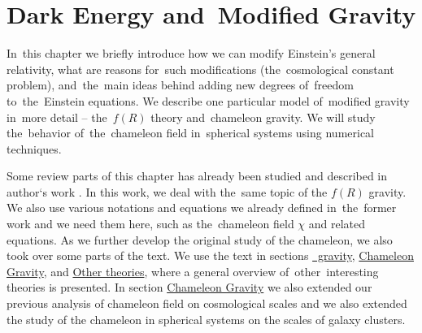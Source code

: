 \chapter{Dark Energy and~Modified Gravity}
\label{chpt:de_mg}
In~this chapter we briefly introduce how we can modify Einstein's general relativity, what are reasons for~such modifications (the~cosmological constant problem), and~the~main ideas behind adding new degrees of~freedom to~the~Einstein equations. We describe one particular model of~modified gravity in~more detail -- the~$f(R)$ theory and~chameleon gravity. We will study the~behavior of~the~chameleon field in~spherical systems using numerical techniques.

Some review parts of this chapter has already been studied and described in author`s work \textcite{mastersthesis_vrastil}. In this work, we deal with the~same topic of the $f(R)$ gravity. We also use various notations and equations we already defined in~the~former work and we need them here, such as the~chameleon field $\chi$ and related equations. As we further develop the original study of the chameleon, we also took over some parts of the text. We use the text in sections \hyperref[sec:fR]{\fR\ gravity}, \hyperref[sec_cham]{Chameleon Gravity}, and \hyperref[sec:other]{Other theories}, where a general overview of~other~interesting theories is presented. In section \hyperref[sec_cham]{Chameleon Gravity} we also extended our previous analysis of chameleon field on cosmological scales and we also extended the study of the chameleon in spherical systems on the scales of galaxy clusters.







